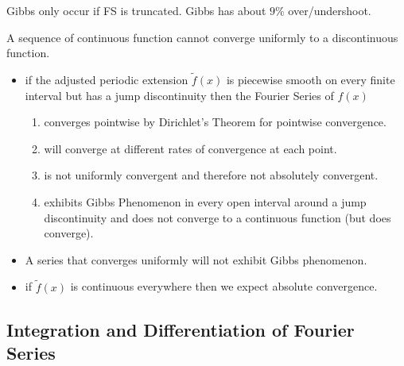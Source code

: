 \documentclass[class=article,crop=false]{standalone}
\begin{document}
\begin{note}[]
Gibbs only occur if FS is truncated. Gibbs has about $ 9\%$ over/undershoot.
\end{note}

\begin{intuition}
	A sequence of continuous function cannot converge uniformly to a discontinuous function.
\end{intuition}

\begin{itemize}
	\item if the adjusted periodic extension $ \tilde{  f}( x) $ is piecewise smooth on every finite interval but has a jump discontinuity then the Fourier Series of $ f(x)$
		 \begin{enumerate}[label=\alph*)]
			\item converges pointwise by Dirichlet's Theorem for pointwise convergence.
			\item will converge at different rates of convergence at each point.
			\item is not uniformly convergent and therefore not absolutely convergent.
			\item exhibits Gibbs Phenomenon in every open interval around a jump discontinuity and does not converge to a continuous function (but does converge).
		\end{enumerate}
	\item A series that converges uniformly will not exhibit Gibbs phenomenon.
	\item if $ \tilde{f}(x)$ is continuous everywhere then we expect absolute convergence.
\end{itemize}

\subsection{Integration and Differentiation of Fourier Series}
\end{document}
